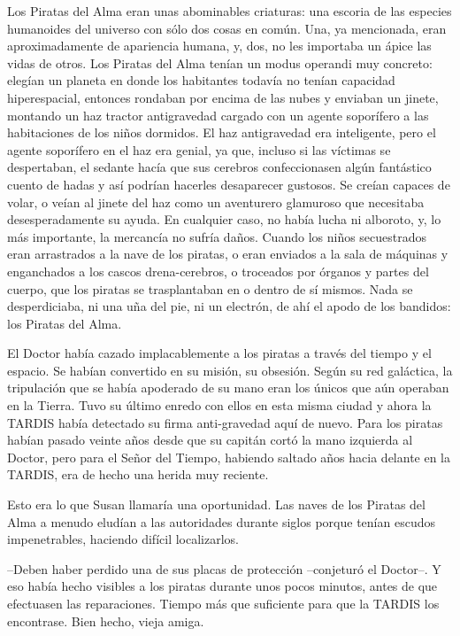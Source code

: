 Los Piratas del Alma eran unas abominables criaturas: una escoria de las especies humanoides del universo con sólo dos cosas en común. Una, ya mencionada, eran aproximadamente de apariencia humana, y, dos, no les importaba un ápice las vidas de otros. Los Piratas del Alma tenían un modus operandi muy concreto: elegían un planeta en donde los habitantes todavía no tenían capacidad hiperespacial, entonces rondaban por encima de las nubes y enviaban un jinete, montando un haz tractor antigravedad cargado con un agente soporífero a las habitaciones de los niños dormidos. El haz antigravedad era inteligente, pero el agente soporífero en el haz era genial, ya que, incluso si las víctimas se despertaban, el sedante hacía que sus cerebros confeccionasen algún fantástico cuento de hadas y así podrían hacerles desaparecer gustosos. Se creían capaces de volar, o veían al jinete del haz como un aventurero glamuroso que necesitaba desesperadamente su ayuda. En cualquier caso, no había lucha ni alboroto, y, lo más importante, la mercancía no sufría daños. Cuando los niños secuestrados eran arrastrados a la nave de los piratas, o eran enviados a la sala de máquinas y enganchados a los cascos drena-cerebros, o troceados por órganos y partes del cuerpo, que los piratas se trasplantaban en o dentro de sí mismos. Nada se desperdiciaba, ni una uña del pie, ni un electrón, de ahí el apodo de los bandidos: los Piratas del Alma.
 
El Doctor había cazado implacablemente a los piratas a través del tiempo y el espacio. Se habían convertido en su misión, su obsesión. Según su red galáctica, la tripulación que se había apoderado de su mano eran los únicos que aún operaban en la Tierra. Tuvo su último enredo con ellos en esta misma ciudad y ahora la TARDIS había detectado su firma anti-gravedad aquí de nuevo. Para los piratas habían pasado veinte años desde que su capitán cortó la mano izquierda al Doctor, pero para el Señor del Tiempo, habiendo saltado años hacia delante en la TARDIS, era de hecho una herida muy reciente.
 
Esto era lo que Susan llamaría una oportunidad. Las naves de los Piratas del Alma a menudo eludían a las autoridades durante siglos porque tenían escudos impenetrables, haciendo difícil localizarlos.
 
--Deben haber perdido una de sus placas de protección --conjeturó el Doctor--. Y eso había hecho visibles a los piratas durante unos pocos minutos, antes de que efectuasen las reparaciones. Tiempo más que suficiente para que la TARDIS los encontrase. Bien hecho, vieja amiga.
 
